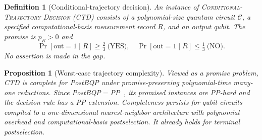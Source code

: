\documentclass[aps,prx,reprint,superscriptaddress,nobibnotes,longbibliography]{revtex4-2}
\newtheorem{proposition}{Proposition}
\newtheorem{definition}{Definition}
\theoremstyle{remark}
\begin{document}
\begin{definition}[Conditional-trajectory decision]
An instance of \textsc{Conditional-Trajectory Decision} (CTD) consists of a polynomial-size quantum circuit $\mathcal C$, a specified computational-basis measurement record $R$, and an output qubit.  The promise is $p_R>0$ and
\begin{equation}
 \Pr[\mathrm{out}=1\mid R]\ge\tfrac23\ \text{(YES)},\quad
 \Pr[\mathrm{out}=1\mid R]\le\tfrac13\ \text{(NO)}.
\end{equation}
No assertion is made in the gap.
\end{definition}

\begin{proposition}[Worst-case trajectory complexity]
\label{thm:complexity}
Viewed as a promise problem, CTD is complete for PostBQP under promise-preserving polynomial-time many-one reductions.  Since PostBQP$=$PP~\cite{Aaronson2005}, its promised instances are PP-hard and the decision rule has a PP extension.  Completeness persists for qubit circuits compiled to a one-dimensional nearest-neighbor architecture with polynomial overhead and computational-basis postselection.  It already holds for terminal postselection.
\end{proposition}
\end{document}
